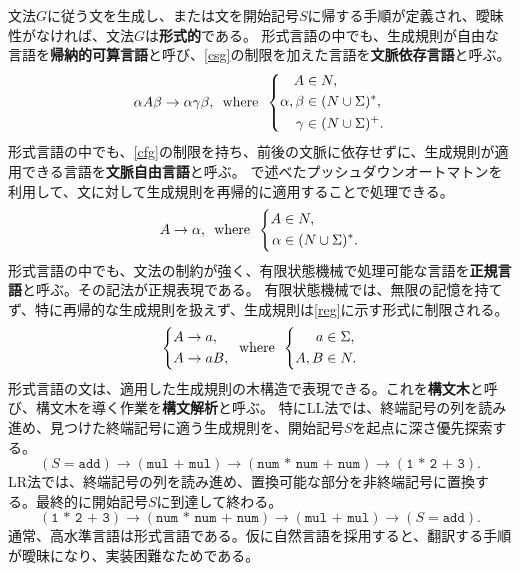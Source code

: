 \documentclass[10pt,a4paper]{book}
\begin{document}
%
文法$G$に従う文を生成し、または文を開始記号$S$に帰する手順が定義され、曖昧性がなければ、文法$G$は\textbf{形式的}である。
形式言語の中でも、生成規則が自由な言語を\textbf{帰納的可算言語}と呼び、\eqref{csg}の制限を加えた言語を\textbf{文脈依存言語}と呼ぶ。
%
\begin{equation}
\label{eq:csg}
\alpha A \beta \to \alpha \gamma \beta,
\enspace\mathrm{where}\enspace
\left\{
\begin{aligned}
A &\in N,\\
\alpha,\beta &\in (N\cup\Sigma)^*,\\
\gamma &\in (N\cup\Sigma)^+.
\end{aligned}
\right.
\end{equation}
%
形式言語の中でも、\eqref{cfg}の制限を持ち、前後の文脈に依存せずに、生成規則が適用できる言語を\textbf{文脈自由言語}と呼ぶ。
で述べたプッシュダウンオートマトンを利用して、文に対して生成規則を再帰的に適用することで処理できる。
%
\begin{equation}
\label{eq:cfg}
A \to \alpha,
\enspace\mathrm{where}\enspace
\left\{
\begin{aligned}
A &\in N,\\
\alpha &\in (N\cup\Sigma)^*.
\end{aligned}
\right.
\end{equation}
%
形式言語の中でも、文法の制約が強く、有限状態機械で処理可能な言語を\textbf{正規言語}と呼ぶ。その記法が正規表現である。
有限状態機械では、無限の記憶を持てず、特に再帰的な生成規則を扱えず、生成規則は\eqref{reg}に示す形式に制限される。
%
\begin{equation}
\label{eq:reg}
\left\{
\begin{aligned}
A &\to a,\\
A &\to aB,
\end{aligned}
\right.
\enspace\mathrm{where}\enspace
\left\{
\begin{aligned}
a &\in \Sigma,\\
A,B &\in N.
\end{aligned}
\right.
\end{equation}
%
形式言語の文は、適用した生成規則の木構造で表現できる。これを\textbf{構文木}と呼び、構文木を導く作業を\textbf{構文解析}と呼ぶ。
特にLL法では、終端記号の列を読み進め、見つけた終端記号に適う生成規則を、開始記号$S$を起点に深さ優先探索する。
%
\begin{equation}
(S=\texttt{add})\to(\texttt{mul + mul})\to(\texttt{num * num + num})\to(\texttt{1 * 2 + 3}).
\end{equation}
%
LR法では、終端記号の列を読み進め、置換可能な部分を非終端記号に置換する。最終的に開始記号$S$に到達して終わる。
%
\begin{equation}
(\texttt{1 * 2 + 3})\to(\texttt{num * num + num})\to(\texttt{mul + mul})\to(S=\texttt{add}).
\end{equation}
%
通常、高水準言語は形式言語である。仮に自然言語を採用すると、翻訳する手順が曖昧になり、実装困難なためである。
\end{document}

